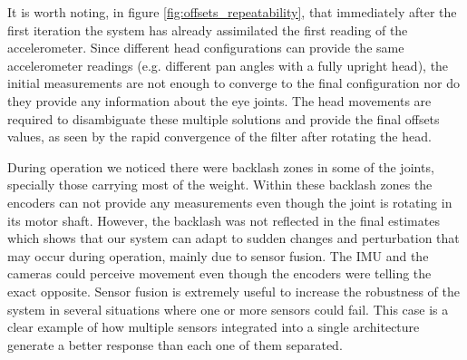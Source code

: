 It is worth noting, in figure \ref{fig:offsets_repeatability}, that immediately after the first iteration the system has already assimilated the first reading of the accelerometer. Since different head configurations can provide the same accelerometer readings (e.g. different pan angles with a fully upright head), the initial measurements are not enough to converge to the final configuration nor do they provide any information about the eye joints. The head movements are required to disambiguate these multiple solutions and provide the final offsets values, as seen by the rapid convergence of the filter after rotating the head.

During operation we noticed there were backlash zones in some of the joints, specially those carrying most of the weight. Within these backlash zones the encoders can not provide any measurements even though the joint is rotating in its motor shaft. However, the backlash was not reflected in the final estimates which shows that our system can adapt to sudden changes and perturbation that may occur during operation, mainly due to sensor fusion. The IMU and the cameras could perceive movement even though the encoders were telling the exact opposite. Sensor fusion is extremely useful to increase the robustness of the system in several situations where one or more sensors could fail. This case is a clear example of how multiple sensors integrated into a single architecture generate a better response than each one of them separated.